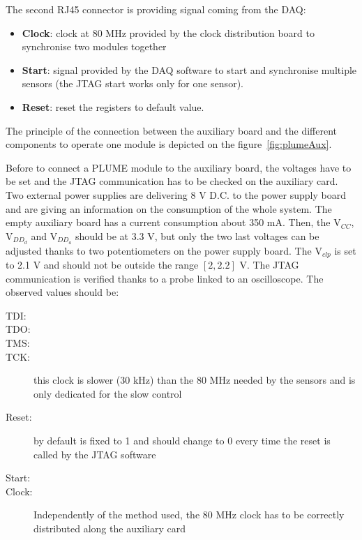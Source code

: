   The second RJ45 connector is providing signal coming from the DAQ:
  \begin{itemize}
    \item \textbf{Clock}: clock at 80 MHz provided by the clock distribution board to synchronise two modules together
    \item \textbf{Start}: signal provided by the DAQ software to start and synchronise multiple sensors (the JTAG start works only for one sensor).
    \item \textbf{Reset}: reset the registers to default value. 
  \end{itemize}

  The principle of the connection between the auxiliary board and the different components to operate one module is depicted on the figure~\ref{fig:plumeAux}.

  Before to connect a PLUME module to the auxiliary board, the voltages have to be set and the JTAG communication has to be checked on the auxiliary card.
  Two external power supplies are delivering 8 V D.C. to the power supply board and are giving an information on the consumption of the whole system.
  The empty auxiliary board has a current consumption about 350 mA.
  Then, the $\text{V}_{CC}$, $\text{V}_{DD_d}$ and $\text{V}_{DD_a}$ should be at 3.3 V, but only the two last voltages can be adjusted thanks to two potentiometers on the power supply board.
  The $\text{V}_{clp}$ is set to 2.1 V and should not be outside the range $\left[2, 2.2\right]$ V.
  The JTAG communication is verified thanks to a probe linked to an oscilloscope.
  The observed values should be:

  \begin{description}
    \item[TDI:]
    \item[TDO:]
    \item[TMS:]
    \item[TCK:] this clock is slower (30 kHz) than the 80 MHz needed by the sensors and is only dedicated for the slow control
    \item[Reset:] by default is fixed to 1 and should change to 0 every time the reset is called by the JTAG software
    \item[Start:] 
    \item[Clock:] Independently of the method used, the 80 MHz clock has to be correctly distributed along the auxiliary card
  \end{description}


